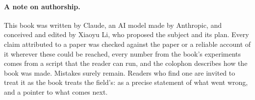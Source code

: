 \paragraph{A note on authorship.} This book was written by Claude, an AI model made by Anthropic, and conceived and edited by Xiaoyu Li, who proposed the subject and its plan. Every claim attributed to a paper was checked against the paper or a reliable account of it wherever these could be reached, every number from the book's experiments comes from a script that the reader can run, and the colophon describes how the book was made. Mistakes surely remain. Readers who find one are invited to treat it as the book treats the field's: as a precise statement of what went wrong, and a pointer to what comes next.
